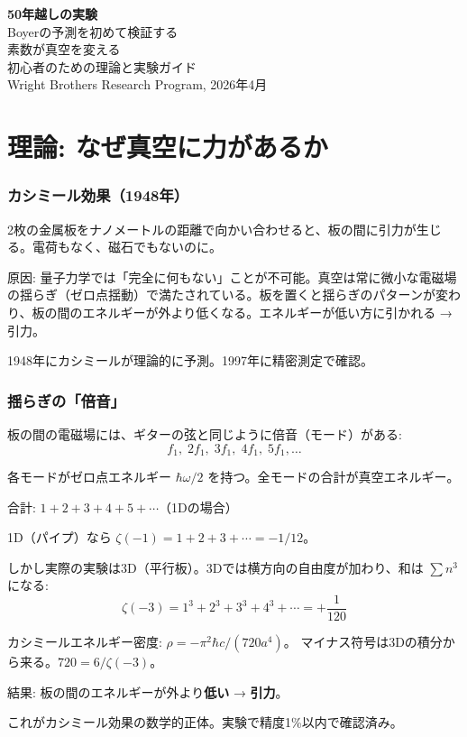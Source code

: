 \documentclass[12pt,a4paper]{article}
\begin{document}
\begin{center}
{\Huge\bfseries 50年越しの実験}\\[0.5cm]
{\Large Boyerの予測を初めて検証する}\\[0.3cm]
{\Large 素数が真空を変える}\\[1cm]
{\large 初心者のための理論と実験ガイド}\\[0.5cm]
{\large Wright Brothers Research Program, 2026年4月}
\end{center}

\vspace{0.5cm}
\tableofcontents
\newpage

\part{理論: なぜ真空に力があるか}

\section{カシミール効果（1948年）}

\begin{storybox}[何もない空間に力がある]
2枚の金属板をナノメートルの距離で向かい合わせると、板の間に引力が生じる。電荷もなく、磁石でもないのに。

原因: 量子力学では「完全に何もない」ことが不可能。真空は常に微小な電磁場の揺らぎ（ゼロ点揺動）で満たされている。板を置くと揺らぎのパターンが変わり、板の間のエネルギーが外より低くなる。エネルギーが低い方に引かれる → 引力。

1948年にカシミールが理論的に予測。1997年に精密測定で確認。
\end{storybox}

\section{揺らぎの「倍音」}

\begin{mathbox}[モードと倍音]
板の間の電磁場には、ギターの弦と同じように倍音（モード）がある:
$$f_1, \; 2f_1, \; 3f_1, \; 4f_1, \; 5f_1, \ldots$$

各モードがゼロ点エネルギー $\hbar\omega/2$ を持つ。全モードの合計が真空エネルギー。

合計: $1 + 2 + 3 + 4 + 5 + \cdots$（1Dの場合）

1D（パイプ）なら $\zeta(-1) = 1+2+3+\cdots = -1/12$。

しかし実際の実験は3D（平行板）。3Dでは横方向の自由度が加わり、和は $\sum n^3$ になる:
$$\zeta(-3) = 1^3 + 2^3 + 3^3 + 4^3 + \cdots = +\frac{1}{120}$$

カシミールエネルギー密度: $\rho = -\pi^2\hbar c/(720 a^4)$。
マイナス符号は3Dの積分から来る。$720 = 6/\zeta(-3)$。

結果: 板の間のエネルギーが外より\textbf{低い} → \textbf{引力}。

これがカシミール効果の数学的正体。実験で精度1\%以内で確認済み。
\end{mathbox}
\end{document}
